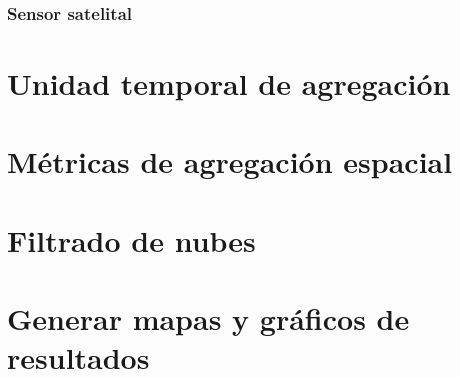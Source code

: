 \documentclass[
]{book}
\begin{document}
\subsection{Sensor satelital}\label{sensor-satelital}

\chapter{Unidad temporal de agregación}\label{unidad-temporal-de-agregaciuxf3n}

\chapter{Métricas de agregación espacial}\label{muxe9tricas-de-agregaciuxf3n-espacial}

\chapter{Filtrado de nubes}\label{filtrado-de-nubes}

\chapter{Generar mapas y gráficos de resultados}\label{generar-mapas-y-gruxe1ficos-de-resultados}


\end{document}
